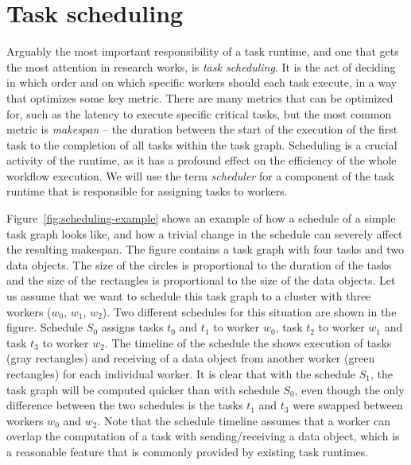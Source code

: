 \section{Task scheduling}
Arguably the most important responsibility of a task runtime, and one that gets the most attention
in research works, is \emph{task scheduling}. It is the act of deciding in which order and on which
specific workers should each task execute, in a way that optimizes some key metric. There are many
metrics that can be optimized for, such as the latency to execute specific critical tasks, but the
most common metric is \emph{makespan} -- the duration between the start of the execution of
the first task to the completion of all tasks within the task graph. Scheduling is a crucial
activity of the runtime, as it has a profound effect on the efficiency of the whole workflow
execution. We will use the term \emph{scheduler} for a component of the task runtime that is
responsible for assigning tasks to workers.


Figure~\ref{fig:scheduling-example} shows an example of how a schedule of a simple task graph looks like,
and how a trivial change in the schedule can severely affect the resulting makespan. The figure
contains a task graph with four tasks and two data objects. The size of the circles is proportional
to the duration of the tasks and the size of the rectangles is proportional to the size of the data
objects. Let us assume that we want to schedule this task graph to a cluster with three workers
($w_0$, $w_1$, $w_2$). Two different schedules
for this situation are shown in the figure. Schedule $S_0$ assigns tasks
$t_0$ and $t_1$ to worker $w_0$, task
$t_2$ to worker $w_1$ and task $t_3$ to worker
$w_2$. The timeline of the schedule the shows execution of tasks (gray rectangles)
and receiving of a data object from another worker (green rectangles) for each individual worker.
It is clear that with the schedule $S_1$, the task graph will be computed quicker
than with schedule $S_0$, even though the only difference between the two
schedules is the tasks $t_1$ and $t_3$ were swapped between
workers $w_0$ and $w_2$. Note that the schedule timeline assumes
that a worker can overlap the computation of a task with sending/receiving a data object, which is
a reasonable feature that is commonly provided by existing task runtimes.

